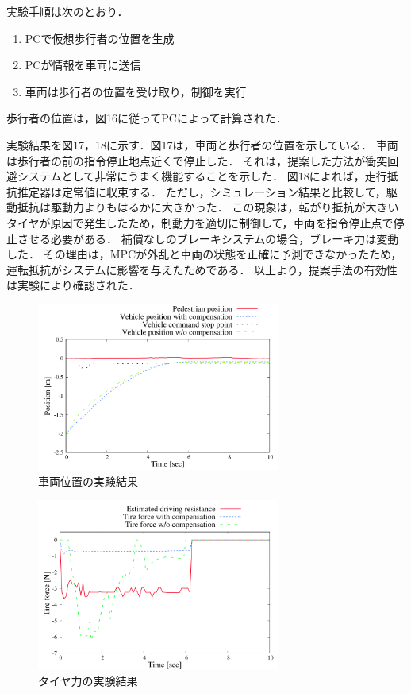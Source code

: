 実験手順は次のとおり．
\begin{enumerate}
    \item PCで仮想歩行者の位置を生成
    \item PCが情報を車両に送信
    \item 車両は歩行者の位置を受け取り，制御を実行
\end{enumerate}

歩行者の位置は，図16に従ってPCによって計算された．

実験結果を図17，18に示す．図17は，車両と歩行者の位置を示している． 車両は歩行者の前の指令停止地点近くで停止した． それは，提案した方法が衝突回避システムとして非常にうまく機能することを示した． 図18によれば，走行抵抗推定器は定常値に収束する． ただし，シミュレーション結果と比較して，駆動抵抗は駆動力よりもはるかに大きかった． この現象は，転がり抵抗が大きいタイヤが原因で発生したため，制動力を適切に制御して，車両を指令停止点で停止させる必要がある． 補償なしのブレーキシステムの場合，ブレーキ力は変動した． その理由は，MPCが外乱と車両の状態を正確に予測できなかったため，運転抵抗がシステムに影響を与えたためである． 以上より，提案手法の有効性は実験により確認された．
\begin{figure}[H]
    \centering
    \includegraphics[width=8cm]{./fig/fig17.png}
    \caption{車両位置の実験結果}
\end{figure}
\begin{figure}[H]
    \centering
    \includegraphics[width=8cm]{./fig/fig18.png}
    \caption{タイヤ力の実験結果}
\end{figure}
